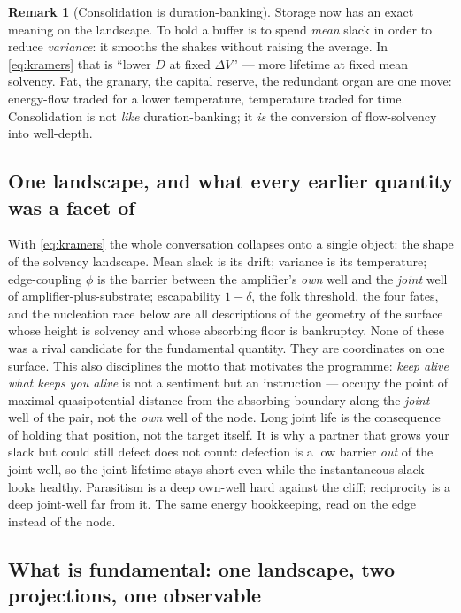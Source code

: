 \documentclass[11pt]{article}
\theoremstyle{plain}
\theoremstyle{definition}
\newtheorem{remark}{Remark}
\begin{document}
\begin{remark}[Consolidation is duration-banking]
\label{rem:consolidation}
Storage now has an exact meaning on the landscape. To hold a buffer is to spend \emph{mean} slack in order to reduce \emph{variance}: it smooths the shakes without raising the average. In \eqref{eq:kramers} that is ``lower $D$ at fixed $\Delta V$'' --- more lifetime at fixed mean solvency. Fat, the granary, the capital reserve, the redundant organ are one move: energy-flow traded for a lower temperature, temperature traded for time. Consolidation is not \emph{like} duration-banking; it \emph{is} the conversion of flow-solvency into well-depth.
\end{remark}

\subsection{One landscape, and what every earlier quantity was a facet of}

With \eqref{eq:kramers} the whole conversation collapses onto a single object: the shape of the solvency landscape. Mean slack is its drift; variance is its temperature; edge-coupling $\phi$ is the barrier between the amplifier's \emph{own} well and the \emph{joint} well of amplifier-plus-substrate; escapability $1-\delta$, the folk threshold, the four fates, and the nucleation race below are all descriptions of the geometry of the surface whose height is solvency and whose absorbing floor is bankruptcy. None of these was a rival candidate for the fundamental quantity. They are coordinates on one surface. This also disciplines the motto that motivates the programme: \emph{keep alive what keeps you alive} is not a sentiment but an instruction --- occupy the point of maximal quasipotential distance from the absorbing boundary along the \emph{joint} well of the pair, not the \emph{own} well of the node. Long joint life is the consequence of holding that position, not the target itself. It is why a partner that grows your slack but could still defect does not count: defection is a low barrier \emph{out} of the joint well, so the joint lifetime stays short even while the instantaneous slack looks healthy. Parasitism is a deep own-well hard against the cliff; reciprocity is a deep joint-well far from it. The same energy bookkeeping, read on the edge instead of the node.

\subsection{What is fundamental: one landscape, two projections, one observable}
\label{sec:invariant}
\end{document}
